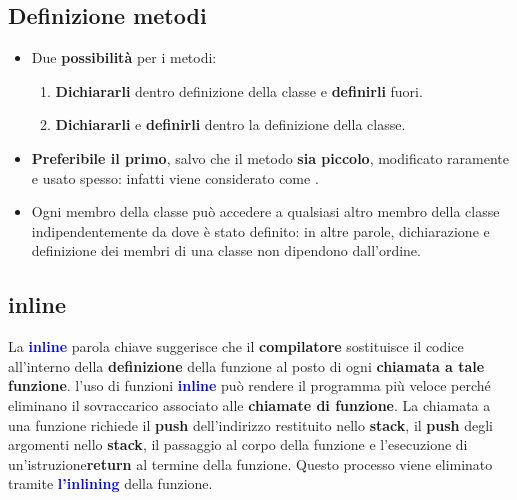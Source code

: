 \subsection{Definizione metodi}
\begin{itemize}
    \item  Due \textbf{possibilità} per i metodi:
    \begin{enumerate}
        \item \textbf{Dichiararli} dentro definizione della classe e \textbf{definirli} fuori.
        \item \textbf{Dichiararli} e \textbf{definirli} dentro la definizione della classe.
    \end{enumerate}

    \item \textbf{Preferibile il primo}, salvo che il metodo \textbf{sia piccolo},
    modificato raramente e usato spesso: infatti viene
    considerato come .
    \item Ogni membro della classe può accedere a qualsiasi altro
    membro della classe indipendentemente da dove è stato
    definito: in altre parole, dichiarazione e definizione dei
    membri di una classe non dipendono dall’ordine.
\end{itemize}
 
\subsection{inline}
La \textbf{\textcolor{blue}{inline}} parola chiave suggerisce che il \textbf{compilatore} sostituisce il codice all'interno della \textbf{definizione} della funzione al posto di ogni \textbf{chiamata a tale funzione}.\newline\newline
l'uso di funzioni \textbf{\textcolor{blue}{inline}} può rendere il programma più veloce perché eliminano il sovraccarico associato alle \textbf{chiamate di funzione}. La chiamata a una funzione richiede il \textbf{push} dell'indirizzo restituito nello \textbf{stack}, il \textbf{push} degli argomenti nello \textbf{stack}, il passaggio al corpo della funzione e l'esecuzione di un'istruzione\textbf{return} al termine della funzione. Questo processo viene eliminato tramite \textbf{\textcolor{blue}{l'inlining}} della funzione.
 
\newpage
